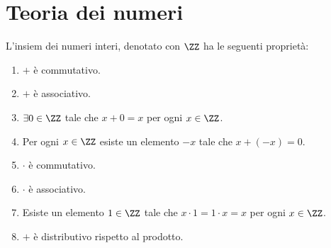 \documentclass[11pt]{scrartcl}
\begin{document}
	\newpage
	
	\section{Teoria dei numeri}
	
	\begin{proposition}
		L'insiem dei numeri interi, denotato con $\ZZ$ ha le seguenti proprietà:
		\begin{enumerate}
			\item $+$ è commutativo.
			\item $+$ è associativo.
			\item $\exists 0\in \ZZ$ tale che $x+0=x$ per ogni $x\in\ZZ$.
			\item Per ogni $x\in \ZZ$ esiste un elemento $-x$ tale che $x+(-x)=0$.
			\item $\cdot$ è commutativo.
			\item $\cdot$ è associativo.
			\item Esiste un elemento $1\in\ZZ$ tale che $x\cdot 1=1\cdot x=x$ per ogni $x\in\ZZ$.
			\item $+$ è distributivo rispetto al prodotto.
		\end{enumerate}
	\end{proposition}
	
\end{document}
